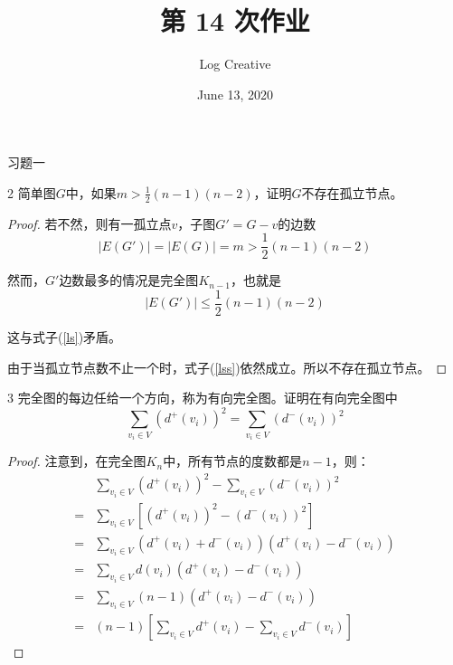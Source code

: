 \documentclass[12pt]{article}
\title{第 14 次作业}
\author{Log Creative}
\date{June 13, 2020}
\newenvironment{firstlayer}%
{\begin{list}{}{\renewcommand{\makelabel}[1]{\textbf{##1}.\hfil}
}}
{\end{list}}
\begin{document}
\begin{CJK}{UTF8}{gbsn}

\maketitle

\begin{firstlayer}
  \item[习题一]
  \begin{firstlayer}
    \item[2]简单图$G$中，如果$m>\frac{1}{2}(n-1)(n-2)$，证明$G$不存在孤立节点。
    \begin{proof}
      若不然，则有一孤立点$v$，子图$G'=G-v$的边数
      \begin{equation}\label{ls}
        \mid E(G')\mid =\mid E(G)\mid=m>\frac{1}{2}(n-1)(n-2)
      \end{equation}
      
然而，$G'$边数最多的情况是完全图$K_{n-1}$，也就是
\begin{equation}\label{lss}
  \mid E(G')\mid \leq \frac{1}{2}(n-1)(n-2)
\end{equation}

这与式子(\ref{ls})矛盾。

由于当孤立节点数不止一个时，式子(\ref{lss})依然成立。所以不存在孤立节点。

    \end{proof}
    \item[3]完全图的每边任给一个方向，称为有向完全图。证明在有向完全图中
\begin{equation}\label{3p}
  \sum_{v_i\in V}(d^+(v_i))^2 = \sum_{v_i\in V}(d^-(v_i))^2
\end{equation}

\begin{proof}
  注意到，在完全图$K_n$中，所有节点的度数都是$n-1$，则：
\begin{align}
    &\sum_{v_i\in V}(d^+(v_i))^2 - \sum_{v_i\in V}(d^-(v_i))^2 \nonumber\\
=&\sum_{v_i\in V} \left[(d^+(v_i))^2 - (d^-(v_i))^2\right]\nonumber\\
=&\sum_{v_i\in V}(d^+(v_i)+d^-(v_i))(d^+(v_i)-d^-(v_i))\nonumber\\
=&\sum_{v_i\in V}d(v_i)(d^+(v_i)-d^-(v_i))\nonumber\\
=&\sum_{v_i\in V}(n-1)(d^+(v_i)-d^-(v_i))\nonumber\\
=&(n-1)\left[\sum_{v_i\in V}d^+(v_i)-\sum_{v_i\in V}d^-(v_i)\right]
\end{align}


\end{proof}
\end{firstlayer}
\end{firstlayer}
\end{CJK}
\end{document}
